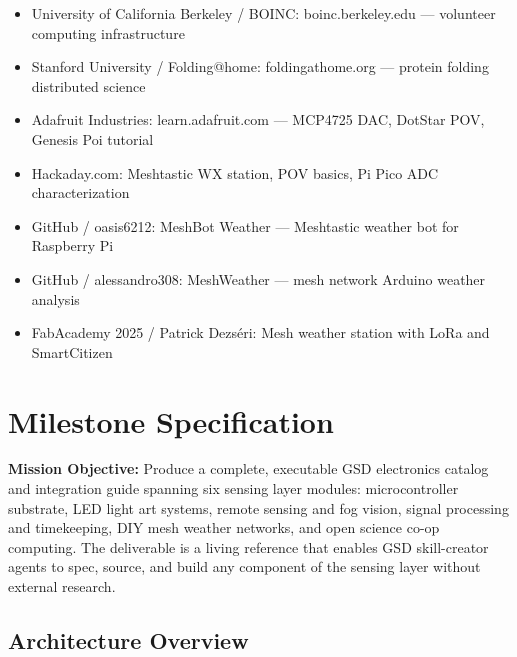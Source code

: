 \documentclass[11pt,letterpaper]{article}
\newcommand{\stageheader}[2]{%
  \noindent\colorbox{#2}{\makebox[\textwidth][l]{%
    \textcolor{white}{\bfseries\sffamily\hspace{6pt}#1\hspace{6pt}}}}%
  \vspace{0.5em}\par%
}
\begin{document}
\begin{itemize}[leftmargin=1.5em]
  \item University of California Berkeley / BOINC: boinc.berkeley.edu --- volunteer computing infrastructure
  \item Stanford University / Folding@home: foldingathome.org --- protein folding distributed science
  \item Adafruit Industries: learn.adafruit.com --- MCP4725 DAC, DotStar POV, Genesis Poi tutorial
  \item Hackaday.com: Meshtastic WX station, POV basics, Pi Pico ADC characterization
  \item GitHub / oasis6212: MeshBot Weather --- Meshtastic weather bot for Raspberry Pi
  \item GitHub / alessandro308: MeshWeather --- mesh network Arduino weather analysis
  \item FabAcademy 2025 / Patrick Dezséri: Mesh weather station with LoRa and SmartCitizen
\end{itemize}

\newpage
\stageheader{STAGE 3 --- MISSION PACKAGE}{tertiary}

\section{Milestone Specification}

\textbf{Mission Objective:} Produce a complete, executable GSD electronics catalog and integration guide spanning six sensing layer modules: microcontroller substrate, LED light art systems, remote sensing and fog vision, signal processing and timekeeping, DIY mesh weather networks, and open science co-op computing. The deliverable is a living reference that enables GSD skill-creator agents to spec, source, and build any component of the sensing layer without external research.

\subsection{Architecture Overview}
\end{document}
